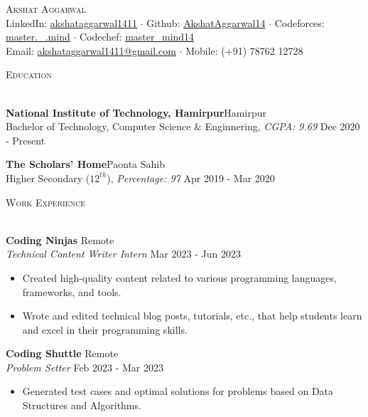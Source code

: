 \documentclass[a4paper]{article}
\newcommand{\bulletSep} { \vspace{1.5mm} }
\newcommand{\sectionSep} { \vspace{3mm} }
\newcommand{\lineunder} {
    \vspace*{-8pt} \\
    \hspace*{-15pt} \hrulefill \\
}
\newcommand{\header} [1] {
    {\hspace*{-18pt}\vspace*{6pt} {
        \fontfamily{qcs}\selectfont \large \scshape #1
    }}
    \vspace*{-6pt} \lineunder
    \vspace{1mm}
}
\newcommand{\educationItem}[5]{
    \textbf{#1}\hfill #2\\
    #3, \textit{#4} \hfill #5\\
}
\newcommand{\experienceItem}[5]{
    \textbf{#1} \hfill #2 \\
    \textit{#3} \hfill #4 \\
    \begin{itemize}
        #5
    \end{itemize}
}
\begin{document}

\begin{center}
    {\Huge \scshape {}\selectfont Akshat Aggarwal}\\
    \vspace{0.5mm}
    LinkedIn: \href{https://www.linkedin.com/in/akshataggarwal1411/}{akshataggarwal1411} $\cdot$
    Github: \href{https://github.com/AkshatAggarwal14}{AkshatAggarwal14} $\cdot$
    Codeforces: \href{https://codeforces.com/profile/master._.mind}{master.\_.mind} $\cdot$
    Codechef: \href{https://www.codechef.com/users/master_mind14}{master\_mind14} \\
    \vspace{1mm}
    Email: \href {mailto:akshataggarwal1411@gmail.com}{akshataggarwal1411@gmail.com} $\cdot$ Mobile: (+91) 78762 12728\\
\end{center}

\vspace{-2mm}


\header{Education}

\educationItem{National Institute of Technology, Hamirpur}{Hamirpur}{Bachelor of Technology, Computer Science \& Enginnering}{CGPA: 9.69}{Dec 2020 - Present}
\bulletSep

\educationItem{The Scholars' Home}{Paonta Sahib}{Higher Secondary ($12^{th}$)}{Percentage: 97}{Apr 2019 - Mar 2020}
\sectionSep


\header{Work Experience}

\experienceItem{Coding Ninjas}{Remote}{Technical Content Writer Intern}{Mar 2023 - Jun 2023}{
    \item Created high-quality content related to various programming languages, frameworks, and tools.
    \item Wrote and edited technical blog posts, tutorials, etc., that help students learn and excel in their programming skills.
}
\bulletSep

\experienceItem{Coding Shuttle}{Remote}{Problem Setter}{Feb 2023 - Mar 2023}{
    \item Generated test cases and optimal solutions for problems based on Data Structures and Algorithms.
}
\sectionSep

\end{document}
